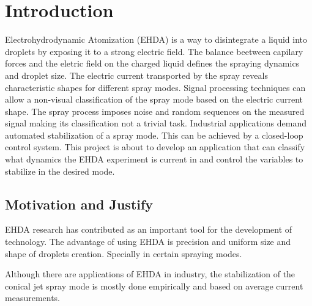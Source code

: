 \chapter{Introduction}
\label{chap:intro} 

Electrohydrodynamic Atomization (EHDA) is a way to disintegrate a liquid into droplets by exposing it to a strong electric field.\cite{prunet}
The balance beetween capilary forces and the eletric field on the charged liquid defines the spraying dynamics and droplet size.
The electric current transported by the spray reveals characteristic shapes for different spray modes.
Signal processing techniques can allow a non-visual classification of the spray mode based on the electric current shape.\cite{Sjaaks}
The spray process imposes noise and random sequences on the measured signal making its classification not a trivial task. 
Industrial applications demand automated stabilization of a spray mode. 
This can be achieved by a closed-loop control system. 
This project is about to develop an application that can classify what dynamics the EHDA experiment is current in and control the variables to stabilize in the desired mode. 


\section{Motivation and Justify}
\label{sec:motivacao}


EHDA research has contributed as an important tool for the development of technology. 
The advantage of using EHDA is precision and uniform size and shape of droplets creation. Specially in certain spraying modes.

Although there are applications of EHDA in industry, the stabilization of the conical jet spray mode is mostly done empirically and based on average current measurements.

